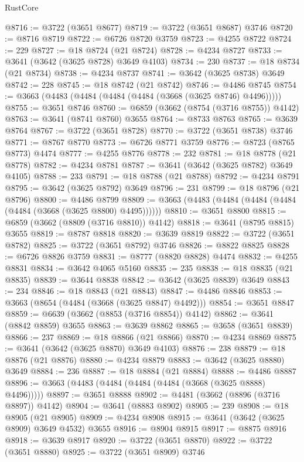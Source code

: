 \begin{lexlean}{RustCore}
\begin{coremodule}
@8716 := @3722 (@3651 @8677)
@8719 := @3722 (@3651 @8687) @3746
@8720 := @8716 @8719
@8722 := @6726 @8720 @3759
@8723 := @4255 @8722
@8724 := 229
@8727 := @18 @8724 (@21 @8724)
@8728 := @4234 @8727
@8733 := @3641 (@3642 (@3625 @8728) @3649 @4103)
@8734 := 230
@8737 := @18 @8734 (@21 @8734)
@8738 := @4234 @8737
@8741 := @3642 (@3625 @8738) @3649
@8742 := 228
@8745 := @18 @8742 (@21 @8742)
@8746 := @4486 @8745
@8754 := @3663 (@4483 (@4484 (@4484 (@4484 (@3668 (@3625 @8746) @4496)))))
@8755 := @3651 @8746
@8760 := @6859 (@3662 (@8754 (@3716 @8755)) @4142)
@8763 := @3641 (@8741 @8760) @3655
@8764 := @8733 @8763
@8765 := @3639 @8764
@8767 := @3722 (@3651 @8728)
@8770 := @3722 (@3651 @8738) @3746
@8771 := @8767 @8770
@8773 := @6726 @8771 @3759
@8776 := @8723 (@8765 @8773) @4474
@8777 := @4255 @8776
@8778 := 232
@8781 := @18 @8778 (@21 @8778)
@8782 := @4234 @8781
@8787 := @3641 (@3642 (@3625 @8782) @3649 @4105)
@8788 := 233
@8791 := @18 @8788 (@21 @8788)
@8792 := @4234 @8791
@8795 := @3642 (@3625 @8792) @3649
@8796 := 231
@8799 := @18 @8796 (@21 @8796)
@8800 := @4486 @8799
@8809 := @3663 (@4483 (@4484 (@4484 (@4484 (@4484 (@3668 (@3625 @8800) @4495))))))
@8810 := @3651 @8800
@8815 := @6859 (@3662 (@8809 (@3716 @8810)) @4142)
@8818 := @3641 (@8795 @8815) @3655
@8819 := @8787 @8818
@8820 := @3639 @8819
@8822 := @3722 (@3651 @8782)
@8825 := @3722 (@3651 @8792) @3746
@8826 := @8822 @8825
@8828 := @6726 @8826 @3759
@8831 := @8777 (@8820 @8828) @4474
@8832 := @4255 @8831
@8834 := @3642 @4065 @5160
@8835 := 235
@8838 := @18 @8835 (@21 @8835)
@8839 := @3644 @8838
@8842 := @3642 (@3625 @8839) @3649
@8843 := 234
@8846 := @18 @8843 (@21 @8843)
@8847 := @4486 @8846
@8853 := @3663 (@8654 (@4484 (@3668 (@3625 @8847) @4492)))
@8854 := @3651 @8847
@8859 := @6639 (@3662 (@8853 (@3716 @8854)) @4142)
@8862 := @3641 (@8842 @8859) @3655
@8863 := @3639 @8862
@8865 := @3658 (@3651 @8839)
@8866 := 237
@8869 := @18 @8866 (@21 @8866)
@8870 := @4234 @8869
@8875 := @3641 (@3642 (@3625 @8870) @3649 @4103)
@8876 := 238
@8879 := @18 @8876 (@21 @8876)
@8880 := @4234 @8879
@8883 := @3642 (@3625 @8880) @3649
@8884 := 236
@8887 := @18 @8884 (@21 @8884)
@8888 := @4486 @8887
@8896 := @3663 (@4483 (@4484 (@4484 (@4484 (@3668 (@3625 @8888) @4496)))))
@8897 := @3651 @8888
@8902 := @4481 (@3662 (@8896 (@3716 @8897)) @4142)
@8904 := @3641 (@8883 @8902)
@8905 := 239
@8908 := @18 @8905 (@21 @8905)
@8909 := @4234 @8908
@8915 := @3641 (@3642 (@3625 @8909) @3649 @4532) @3655
@8916 := @8904 @8915
@8917 := @8875 @8916
@8918 := @3639 @8917
@8920 := @3722 (@3651 @8870)
@8922 := @3722 (@3651 @8880)
@8925 := @3722 (@3651 @8909) @3746

\end{coremodule}
\end{lexlean}
